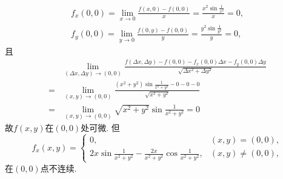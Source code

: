 \documentclass[12pt,UTF8]{ctexart}
\begin{document}
\begin{enumerate}
\begin{enumerate}
\[\begin{aligned}
f_x(0,0)=\lim\limits_{x\rightarrow0}\frac{f(x,0)-f(0,0)}x=\frac{x^2\sin\frac1{x^2}}x=0,\\
f_y(0,0)=\lim\limits_{y\rightarrow0}\frac{f(0,y)-f(0,0)}y=\frac{y^2\sin\frac1{y^2}}y=0,
\end{aligned}\]
且
\[\begin{aligned}
&\lim\limits_{(\Delta x,\Delta y)\rightarrow(0,0)}\frac{f(\Delta x,\Delta y)-f(0,0)-f_x(0,0)\Delta x-f_y(0,0)\Delta y}{\sqrt{\Delta x^2+\Delta y^2}}\\
=&\lim\limits_{(x,y)\rightarrow(0,0)}\frac{(x^2+y^2)\sin\frac1{x^2+y^2}-0-0-0}{\sqrt{x^2+y^2}}\\
=&\lim\limits_{(x,y)\rightarrow(0,0)}\sqrt{x^2+y^2}\sin\frac1{x^2+y^2}=0
\end{aligned}\]
故$f(x,y)$在$(0,0)$处可微. 但
\[f_x(x,y)=\begin{cases}
0,&(x,y)=(0,0),\\
2x\sin\frac1{x^2+y^2}-\frac{2x}{x^2+y^2}\cos\frac1{x^2+y^2},&(x,y)\neq(0,0),
\end{cases}\]
在$(0,0)$点不连续.



\end{enumerate}
\end{enumerate}
\end{document}
